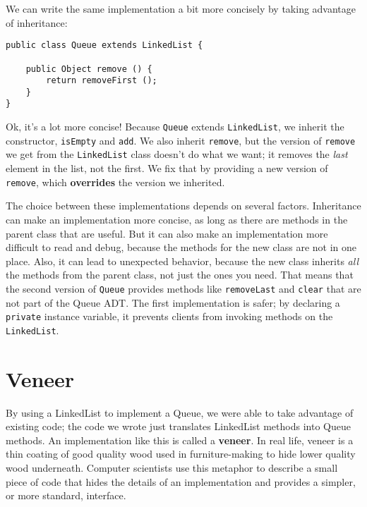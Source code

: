 We can write the same implementation a bit more concisely by taking
advantage of inheritance:

\begin{verbatim}
public class Queue extends LinkedList {

    public Object remove () {
        return removeFirst ();
    }
}
\end{verbatim}
%
Ok, it's a lot more concise!  Because {\tt Queue} extends {\tt LinkedList},
we inherit the constructor, {\tt isEmpty} and {\tt add}.  We also
inherit {\tt remove}, but the version of {\tt remove} we get from
the {\tt LinkedList} class doesn't do what we want; it removes
the {\em last} element in the list, not the first.  We fix that
by providing a new version of {\tt remove}, which {\bf overrides}
the version we inherited.

The choice between these implementations depends on several factors.
Inheritance can make an implementation more concise, as long as
there are methods in the parent class that are useful.  But it can
also make an implementation more difficult to read and debug, because
the methods for the new class are not in one place.  Also, it can
lead to unexpected behavior, because the new class inherits {\em all}
the methods from the parent class, not just the ones you need.
That means that the second version of {\tt Queue}
provides methods like {\tt removeLast} and {\tt clear} that
are not part of the Queue ADT.
The first implementation is safer;
by declaring a {\tt private}
instance variable, it prevents
clients from invoking methods on the {\tt LinkedList}.



\section{Veneer}

By using a LinkedList to implement a Queue, we were able
to take advantage of existing code; the code we wrote just
translates LinkedList methods into Queue methods.
An implementation like this is called a {\bf veneer}.  In
real life, veneer is a thin coating of good quality wood used
in furniture-making to hide lower quality wood underneath.
Computer scientists use this metaphor to describe a small
piece of code that hides the details of an implementation and
provides a simpler, or more standard, interface.

